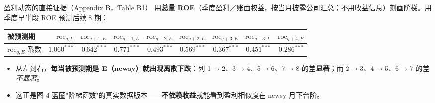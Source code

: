 \documentclass[aspectratio=169,10pt]{beamer}
\newcommand{\tinytab}{\tiny\setlength{\tabcolsep}{2.2pt}\renewcommand{\arraystretch}{1.08}}
\begin{document}
\begin{frame}{盈利动态的直接证据（Appendix B，Table B1）}
	用\textbf{总量 ROE}（季度盈利／账面权益，按当月披露公司汇总；不用收益信息）刻画阶梯。用季度早半段 ROE 预测后续 8 期：
	\tinytab
	\begin{tabular}{lrrrrrrrr}
		\toprule
		被预测期 & $\mathrm{roe}_{q,L}$ & $\mathrm{roe}_{q+1,E}$ & $\mathrm{roe}_{q+1,L}$ & $\mathrm{roe}_{q+2,E}$ & $\mathrm{roe}_{q+2,L}$ & $\mathrm{roe}_{q+3,E}$ & $\mathrm{roe}_{q+3,L}$ & $\mathrm{roe}_{q+4,E}$ \\
		\midrule
		$\mathrm{roe}_{q,E}$ 系数 & $1.060^{***}$ & $0.642^{***}$ & $0.771^{***}$ & $0.493^{***}$ & $0.569^{***}$ & $0.367^{***}$ & $0.451^{***}$ & $0.286^{***}$ \\
		\bottomrule
	\end{tabular}
	\vspace{4pt}
	\begin{itemize}
		\item 从左到右，\textbf{每当被预测期是 E（newsy）就出现离散下跌}：列 1$\to$2、3$\to$4、5$\to$6、7$\to$8 的差\textbf{显著}；而 2$\to$3、4$\to$5、6$\to$7 的差\emph{不显著}。
		\item 这正是图 4 蓝圈"阶梯函数"的真实数据版本——\textbf{不依赖收益}就能看到盈利相似度在 newsy 月下台阶。
	\end{itemize}
\end{frame}
\end{document}
